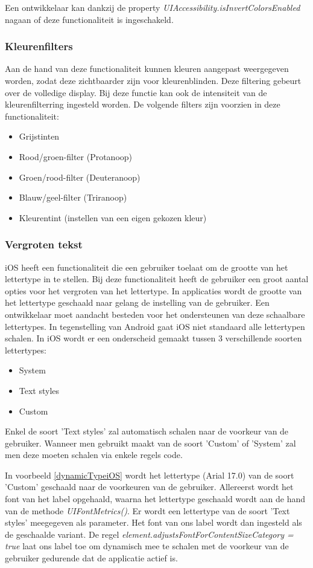 Een ontwikkelaar kan dankzij de property \emph{UIAccessibility.isInvertColorsEnabled} nagaan of deze functionaliteit is ingeschakeld. 
\subsubsection{Kleurenfilters}
Aan de hand van deze functionaliteit kunnen kleuren aangepast weergegeven worden, zodat deze zichtbaarder zijn voor kleurenblinden. Deze filtering gebeurt over de volledige display. Bij deze functie kan ook de intensiteit van de kleurenfilterring ingesteld worden. De volgende filters zijn voorzien in deze functionaliteit: \begin{itemize}
    \item Grijstinten
    \item Rood/groen-filter (Protanoop)
    \item Groen/rood-filter (Deuteranoop)
    \item Blauw/geel-filter (Triranoop)
        \item Kleurentint (instellen van een eigen gekozen kleur)
\end{itemize}
\subsubsection{Vergroten tekst}
iOS heeft een functionaliteit die een gebruiker toelaat om de grootte van het lettertype in te stellen. Bij deze functionaliteit heeft de gebruiker een groot aantal opties voor het vergroten van het lettertype. In applicaties wordt de grootte van het lettertype geschaald naar gelang de instelling van de gebruiker. Een ontwikkelaar moet aandacht besteden voor het ondersteunen van deze schaalbare lettertypes. In tegenstelling van Android gaat iOS niet standaard alle lettertypen schalen.
In iOS wordt er een onderscheid gemaakt tussen 3 verschillende soorten lettertypes:
\begin{itemize}
    \item System
    \item Text styles
    \item Custom
\end{itemize}
Enkel de soort 'Text styles' zal automatisch schalen naar de voorkeur van de gebruiker. Wanneer men gebruikt maakt van de soort 'Custom' of 'System' zal men deze moeten schalen via enkele regels code. 

 
In voorbeeld \ref{dynamicTypeiOS} wordt het lettertype (Arial 17.0) van de soort 'Custom' geschaald naar de voorkeuren van de gebruiker. Allereerst wordt het font van het label opgehaald, waarna het lettertype  geschaald wordt  aan de hand van de methode \emph{UIFontMetrics()}. Er wordt  een lettertype van de soort 'Text styles' meegegeven als parameter. Het font van ons label wordt dan ingesteld als de geschaalde variant. De regel \emph{element.adjustsFontForContentSizeCategory = true} laat ons label toe om dynamisch mee te schalen met de voorkeur van de gebruiker gedurende dat de applicatie actief is.

